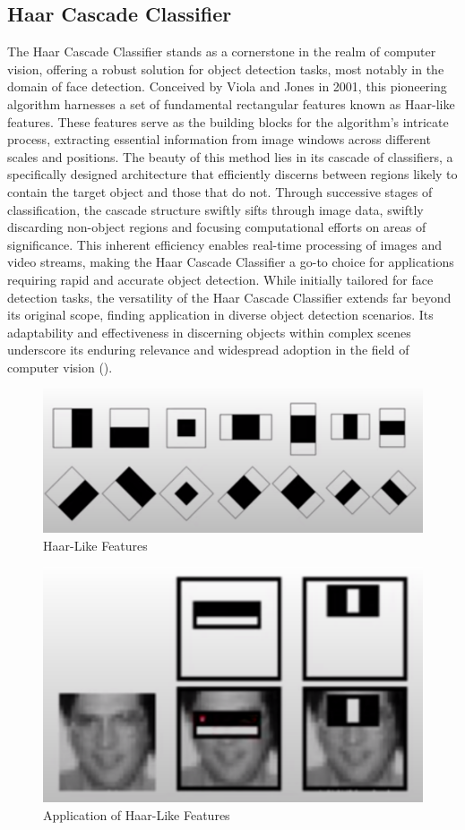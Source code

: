 \documentclass[
]{article}
\begin{document}
\begin{multicols}{2}
\section{Haar Cascade Classifier}
The Haar Cascade Classifier stands as a cornerstone in the realm of computer vision, offering a robust solution for object detection tasks, most notably in the domain of face detection. Conceived by Viola and Jones in 2001, this pioneering algorithm harnesses a set of fundamental rectangular features known as Haar-like features. These features serve as the building blocks for the algorithm's intricate process, extracting essential information from image windows across different scales and positions. The beauty of this method lies in its cascade of classifiers, a specifically designed architecture that efficiently discerns between regions likely to contain the target object and those that do not. Through successive stages of classification, the cascade structure swiftly sifts through image data, swiftly discarding non-object regions and focusing computational efforts on areas of significance. This inherent efficiency enables real-time processing of images and video streams, making the Haar Cascade Classifier a go-to choice for applications requiring rapid and accurate object detection. While initially tailored for face detection tasks, the versatility of the Haar Cascade Classifier extends far beyond its original scope, finding application in diverse object detection scenarios. Its adaptability and effectiveness in discerning objects within complex scenes underscore its enduring relevance and widespread adoption in the field of computer vision (\cite{viola2004robust}).

\end{multicols}

\begin{figure}[htbp]
  \centering
  \includegraphics[width=0.4\linewidth]{images/haar_features.png}
  \caption{Haar-Like Features}
\end{figure}

\begin{figure}[htbp]
  \centering
  \includegraphics[width=0.4\linewidth]{images/haar_features_1.png}
  \caption{Application of Haar-Like Features}
\end{figure}
\end{document}
